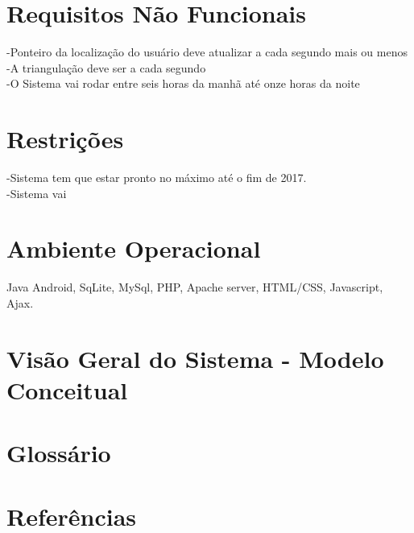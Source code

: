\documentclass[12pt]{article}
\begin{document}
\section*{Requisitos Não Funcionais}
-Ponteiro da localização do usuário deve atualizar a cada segundo mais ou menos\\
-A triangulação deve ser a cada segundo\\
-O Sistema vai rodar entre seis horas da manhã até onze horas da noite
\section*{Restrições}
-Sistema tem que estar pronto no máximo até o fim de 2017.\\
-Sistema vai 
\section*{Ambiente Operacional}
Java Android, SqLite, MySql, PHP, Apache server, HTML/CSS, Javascript, Ajax.
\section*{Visão Geral do Sistema - Modelo Conceitual}

\section*{Glossário}

\section*{Referências}



	\nocite{Doe:2009:Online}
	\printbibliography
	
\end{document}
